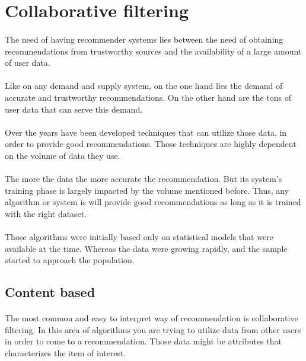 \newpage
\section{Collaborative filtering}
\paragraph{}The need of having recommender systems lies between the need of obtaining recommendations from trustworthy sources and the availability of a large amount of user data.
\paragraph{}Like on any demand and supply system, on the one hand lies the demand of accurate and trustworthy recommendations. On the other hand are the tons of user data that can serve this demand.
\paragraph{}Over the years have been developed techniques that can utilize those data, in order to provide good recommendations. Those techniques are highly dependent on the volume of data they use. 

\paragraph{}The more the data the more accurate the recommendation. But its system's training phase is largely impacted by the volume mentioned before. Thus, any algorithm or system is will provide good recommendations as long as it is trained with the right dataset.

\paragraph{} Those algorithms were initially based only on statistical models that were available at the time. Whereas the data were growing rapidly, and the sample started to approach the population.
\subsection{Content based}

\paragraph{}The most common and easy to interpret way of recommendation is collaborative filtering. In this area of algorithms you are trying to utilize data from other users in order to come to a recommendation. Those data might be attributes that characterizes the item of interest. 
